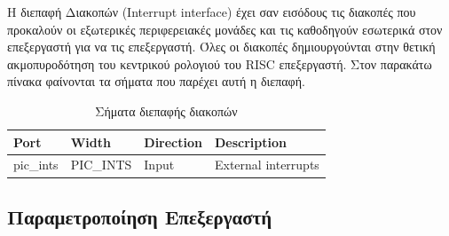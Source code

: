 \documentclass[a4paper,10pt]{article}
\numberwithin{figure}{section}
\numberwithin{table}{section}
\begin{document}
H διεπαφή Διακοπών (Interrupt interface) έχει σαν εισόδους τις διακοπές που προκαλούν οι εξωτερικές περιφερειακές μονάδες και τις καθοδηγούν εσωτερικά στον επεξεργαστή για να τις επεξεργαστή. Όλες οι διακοπές δημιουργούνται στην θετική ακμοπυροδότηση του κεντρικού ρολογιού του RISC επεξεργαστή. Στον παρακάτω πίνακα φαίνονται τα σήματα που παρέχει αυτή η διεπαφή.

{%
\vspace{0.7cm}
\renewcommand{\arraystretch}{1.2}
\setlength{\tabcolsep}{0.3em}
\newcommand{\mc}[3]{\multicolumn{#1}{#2}{#3}}
\begin{table}[h]
\begin{center}
\begin{tabular}{|l|l|l|l|}
\hline
\rowcolor{tcA}
Port & Width & Direction  & Description\\\hline
pic\_ints & PIC\_INTS & Input & External interrupts\\\hline
\end{tabular}
\end{center}
\caption{Σήματα διεπαφής διακοπών}
\end{table}
\vspace{0.7cm}
}%
\newpage
\subsection{Παραμετροποίηση Επεξεργαστή}
\end{document}
